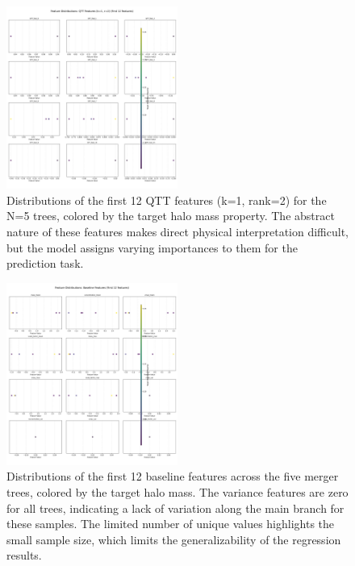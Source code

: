 \documentclass[twocolumn]{aastex631}
\begin{document}
\begin{figure}[h!]
    \centering
    \includegraphics[width=0.5\textwidth]{../input_files/plots/feature_dist_qtt_features_(k=1,_r=2)_2_20250524-175501.png}
    \caption{Distributions of the first 12 QTT features (k=1, rank=2) for the N=5 trees, colored by the target halo mass property. The abstract nature of these features makes direct physical interpretation difficult, but the model assigns varying importances to them for the prediction task.
}
    \label{fig:feature_dist_qtt}
\end{figure}

\begin{figure}[h!]
    \centering
    \includegraphics[width=0.5\textwidth]{../input_files/plots/feature_dist_baseline_features_1_20250524-175501.png}
    \caption{Distributions of the first 12 baseline features across the five merger trees, colored by the target halo mass. The variance features are zero for all trees, indicating a lack of variation along the main branch for these samples. The limited number of unique values highlights the small sample size, which limits the generalizability of the regression results.
}
    \label{fig:feature_dist_baseline}
\end{figure}
\end{document}
